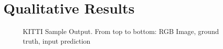 \section{Qualitative Results}
\label{sec:qualitative-results}


  \begin{figure}[h]
    \centering
\caption{KITTI Sample Output. From top to bottom: RGB Image, ground truth, input prediction}
\label{fig:vis1}
\end{figure}

